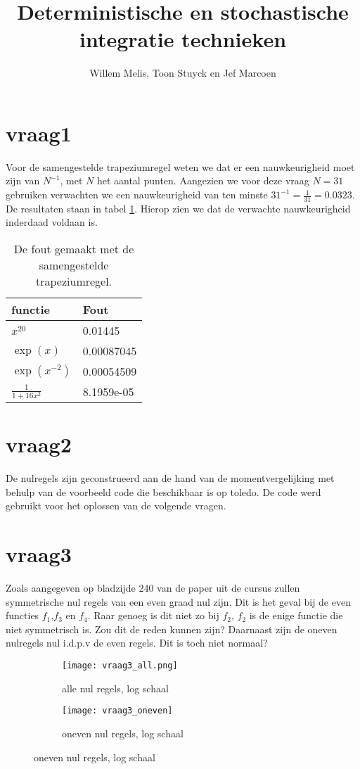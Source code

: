 \documentclass[11pt]{article} %
\title{Deterministische en stochastische integratie technieken}
\author{Willem Melis, Toon Stuyck en Jef Marcoen}
\begin{document}
\maketitle
\newpage
\newpage
\section{vraag1}
Voor de samengestelde trapeziumregel weten we dat er een nauwkeurigheid moet zijn van $N^{-1}$, met $N$ het aantal punten. Aangezien we voor deze vraag $N=31$ gebruiken verwachten we een nauwkeurigheid van ten minste $31^{-1} = \frac{1}{31}=0.0323$. De resultaten staan in tabel \ref{table:oef1}. Hierop zien we dat de verwachte nauwkeurigheid inderdaad voldaan is.

\begin{table}[H]
	\centering
	\caption{De fout gemaakt met de samengestelde trapeziumregel.}
	\label{table:oef1}
	\begin{tabular}{l|l}
		functie & Fout      \\ \hline
		$x^{20}$              & 0.01445    \\
		$\exp{(x)}$             & 0.00087045 \\
		$\exp{(x^{-2})}$        & 0.00054509 \\
		$\frac{1}{1+16x^{2}}$ & 8.1959e-05
	\end{tabular}
\end{table}
\section{vraag2}
De nulregels zijn geconstrueerd aan de hand van de momentvergelijking met behulp van de voorbeeld code die beschikbaar is op toledo. De code werd gebruikt voor het oplossen van de volgende vragen.
\section{vraag3}

Zoals aangegeven op bladzijde 240 van de paper uit de cursus zullen symmetrische nul regels van een even graad nul zijn. Dit is het geval bij de even functies $f_1$,$f_3$ en $f_4$. Raar genoeg is dit niet zo bij $f_2$, $f_2$ is de enige functie die niet symmetrisch is. Zou dit de reden kunnen zijn? Daarnaast zijn de oneven nulregels nul i.d.p.v de even regels. Dit is toch niet normaal?

\begin{figure}[H]
	\centering
	\begin{subfigure}[b]{0.45\textwidth}
		\texttt{[image: vraag3\_all.png]}
		\caption{alle nul regels, log schaal}
	\end{subfigure}
	\begin{subfigure}[b]{0.45\textwidth}
		\texttt{[image: vraag3\_oneven]}
		\caption{oneven nul regels, log schaal}
	\end{subfigure}
\end{figure}
\end{document}
